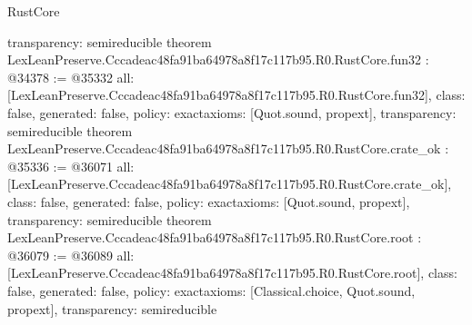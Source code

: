 \begin{lexlean}{RustCore}
\begin{coremodule}
{  transparency: semireducible
}
theorem LexLeanPreserve.Cccadeac48fa91ba64978a8f17c117b95.R0.RustCore.fun32 : @34378 := @35332 {
  all: [LexLeanPreserve.Cccadeac48fa91ba64978a8f17c117b95.R0.RustCore.fun32],
  class: false,
  generated: false,
  policy: exact{axioms: [Quot.sound, propext]},
  transparency: semireducible
}
theorem LexLeanPreserve.Cccadeac48fa91ba64978a8f17c117b95.R0.RustCore.crate_ok : @35336 := @36071 {
  all: [LexLeanPreserve.Cccadeac48fa91ba64978a8f17c117b95.R0.RustCore.crate_ok],
  class: false,
  generated: false,
  policy: exact{axioms: [Quot.sound, propext]},
  transparency: semireducible
}
theorem LexLeanPreserve.Cccadeac48fa91ba64978a8f17c117b95.R0.RustCore.root : @36079 := @36089 {
  all: [LexLeanPreserve.Cccadeac48fa91ba64978a8f17c117b95.R0.RustCore.root],
  class: false,
  generated: false,
  policy: exact{axioms: [Classical.choice, Quot.sound, propext]},
  transparency: semireducible
}


\end{coremodule}
\end{lexlean}

